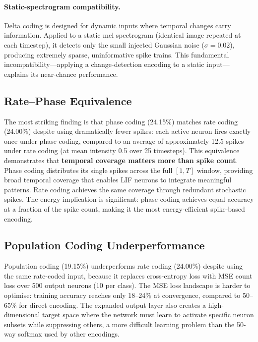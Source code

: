 \paragraph{Static-spectrogram compatibility.}
Delta coding is designed for dynamic inputs where temporal changes carry information. Applied to a static mel spectrogram (identical image repeated at each timestep), it detects only the small injected Gaussian noise ($\sigma = 0.02$), producing extremely sparse, uninformative spike trains. This fundamental incompatibility---applying a change-detection encoding to a static input---explains its near-chance performance.

\subsection{Rate--Phase Equivalence}
\label{ssec:rate-phase}

The most striking finding is that phase coding (24.15\%) matches rate coding (24.00\%) despite using dramatically fewer spikes: each active neuron fires exactly once under phase coding, compared to an average of approximately 12.5 spikes under rate coding (at mean intensity 0.5 over 25 timesteps). This equivalence demonstrates that \textbf{temporal coverage matters more than spike count}. Phase coding distributes its single spikes across the full $[1, T]$ window, providing broad temporal coverage that enables LIF neurons to integrate meaningful patterns. Rate coding achieves the same coverage through redundant stochastic spikes. The energy implication is significant: phase coding achieves equal accuracy at a fraction of the spike count, making it the most energy-efficient spike-based encoding.

\subsection{Population Coding Underperformance}
\label{ssec:population-underperformance}

Population coding (19.15\%) underperforms rate coding (24.00\%) despite using the same rate-coded input, because it replaces cross-entropy loss with MSE count loss over 500 output neurons (10 per class). The MSE loss landscape is harder to optimise: training accuracy reaches only 18--24\% at convergence, compared to 50--65\% for direct encoding. The expanded output layer also creates a high-dimensional target space where the network must learn to activate specific neuron subsets while suppressing others, a more difficult learning problem than the 50-way softmax used by other encodings.

